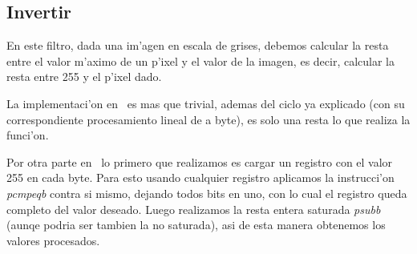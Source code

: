 \subsection{Invertir}
En este filtro, dada una im'agen en escala de grises, debemos calcular la resta entre el valor m'aximo de un p'ixel y el valor de la imagen, es decir, calcular la resta entre 255 y el p'ixel dado.

La implementaci'on en \C\ es mas que trivial, ademas del ciclo ya explicado (con su correspondiente procesamiento lineal de a byte), es solo una resta lo que realiza la funci'on.

Por otra parte en \ass\ lo primero que realizamos es cargar un registro con el valor 255 en cada byte. Para esto usando cualquier registro aplicamos la instrucci'on \textit{pcmpeqb} contra si mismo, dejando todos bits en uno, con lo cual el registro queda completo del valor deseado. Luego realizamos la resta entera saturada \textit{psubb} (aunqe podria ser tambien la no saturada), asi de esta manera obtenemos los valores procesados.
